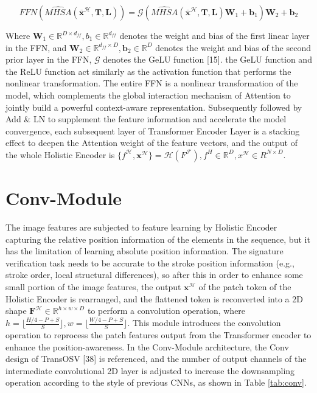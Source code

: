 \begin{equation}
\label{eq10}
  FFN(\hat{MHSA}(\overline{\boldsymbol{x}}^\mathcal{H}, \mathbf{T}, \mathbf{L})) = \mathcal{G}(\hat{MHSA}(\overline{\boldsymbol{x}}^\mathcal{H}, \mathbf{T}, \mathbf{L})\mathbf{W}_1 + \mathbf{b}_1)\mathbf{W}_2 + \mathbf{b}_2
\end{equation}

Where $\mathbf{W}_1\in \mathbb{R}^{D\times d_{ff}}, b_1\in \mathbb{R}^{d_{ff}}$ denotes the weight and bias of the first linear layer in the FFN, and $\mathbf{W}_2\in \mathbb{R}^{d_{ff}\times D}, \mathbf{b}_2\in \mathbb{R}^D$ denotes the weight and bias of the second prior layer in the FFN, $\mathcal{G}$ denotes the GeLU function [15]. the GeLU function and the ReLU function act similarly as the activation function that performs the nonlinear transformation. The entire FFN is a nonlinear transformation of the model, which complements the global interaction mechanism of Attention to jointly build a powerful context-aware representation. Subsequently followed by Add \& LN to supplement the feature information and accelerate the model convergence, each subsequent layer of Transformer Encoder Layer is a stacking effect to deepen the Attention weight of the feature vectors, and the output of the whole Holistic Encoder is $\{f^\mathcal{H}, \boldsymbol{x}^\mathcal{H} \} = \mathcal{H}(F^\mathcal{F}),f^H\in \mathbb{R}^D,x^\mathcal{H} \in R^{N\times D}$.

\section{Conv-Module}

The image features are subjected to feature learning by Holistic Encoder capturing the relative position information of the elements in the sequence, but it has the limitation of learning absolute position information. The signature verification task needs to be accurate to the stroke position information (e.g., stroke order, local structural differences), so after this in order to enhance some small portion of the image features, the output $\boldsymbol{x}^\mathcal{H}$ of the patch token of the Holistic Encoder is rearranged, and the flattened token is reconverted into a 2D shape $\mathbf{F}^\mathcal{H} \in \mathbb{R}^{h\times w\times D}$ to perform a convolution operation, where $h = \lfloor \frac{H/4-P+S}{S}\rfloor,w = \lfloor \frac{W/4-P+S}{S}\rfloor $. This module introduces the convolution operation to reprocess the patch features output from the Transformer encoder to enhance the position-awareness. In the Conv-Module architecture, the Conv design of TransOSV [38] is referenced, and the number of output channels of the intermediate convolutional 2D layer is adjusted to increase the downsampling operation according to the style of previous CNNs, as shown in Table \ref{tab:conv}.


